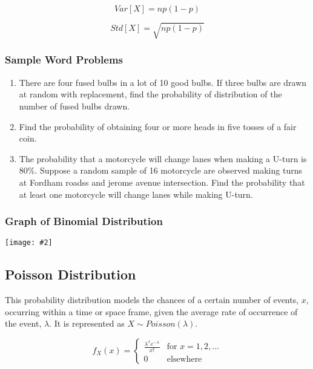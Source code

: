 \documentclass[a4paper]{article}
\newcommand*{\newincludegraphics}[2][]{
    \begin{center}
        \begin{adjustbox}{max size={\textwidth}{\textheight}}
            \texttt{[image: \#2]}
        \end{adjustbox}
    \end{center}
}
\begin{document}
    \begin{equation}
        \label{eq:binomial_variance}
        Var[X] = np(1 - p)
    \end{equation}

    \begin{equation}
        \label{eq:binomial_std}
        Std[X] = \sqrt{np(1 - p)}
    \end{equation}

    \subsubsection*{Sample Word Problems}
    \begin{enumerate}
        \item There are four fused bulbs in a lot of 10 good bulbs. If three bulbs are drawn at random with replacement, find the probability of distribution of the number of fused bulbs drawn.
        \item Find the probability of obtaining four or more heads in five tosses of a fair coin.
        \item The probability that a motorcycle will change lanes when making a U-turn is $80\%$. Suppose a random sample of 16 motorcycle are observed making turns at Fordham roadss and jerome avenue intersection. Find the probability that at least one motorcycle will change lanes while making U-turn.
    \end{enumerate}

    \subsubsection*{Graph of Binomial Distribution}
    \newincludegraphics[]{(D)-Binomial_distribution_visualization}

    \subsection{Poisson Distribution}
    This probability distribution models the chances of a certain number of events, $x$, occurring within a time or space frame, given the average rate of occurrence of the event, $\lambda$. It is represented as $X \sim Poisson(\lambda)$.

    \begin{equation}
        \label{eq:poisson_pmf}
        f_X(x) = \left\{
        \begin{array}{ll}
            \frac{\lambda^{x}e^{-\lambda}}{x!}  & \mbox{for } x = 1, 2, \ldots \\
            0 & \mbox{elsewhere}
        \end{array}
    \right.
    \end{equation}
\end{document}
